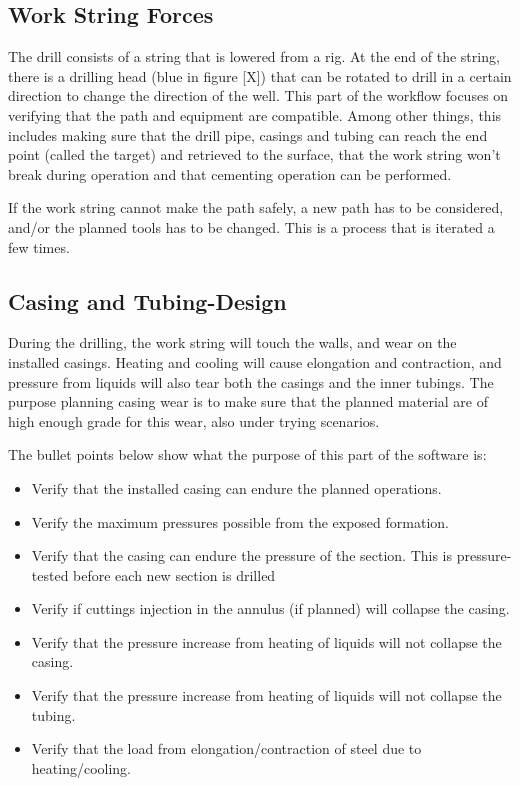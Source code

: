 \documentclass{report}
\begin{document}
\subsection{Work String Forces}
The drill consists of a string that is lowered from a rig. At the end of the string, there is a drilling head (blue in figure [X]) that can be rotated to drill in a certain direction to change the direction of the well. This part of the workflow focuses on verifying that the path and equipment are compatible. Among other things, this includes making sure that the drill pipe, casings and tubing can reach the end point (called the target) and retrieved to the surface, that the work string won’t break during operation and that cementing operation can be performed.

If the work string cannot make the path safely, a new path has to be considered, and/or the planned tools has to be changed. This is a process that is iterated a few times.

\subsection{Casing and Tubing-Design}
During the drilling, the work string will touch the walls, and wear on the installed casings. Heating and cooling will cause elongation and contraction, and pressure from liquids will also tear both the casings and the inner tubings. The purpose planning casing wear is to make sure that the planned material are of high enough grade for this wear, also under trying scenarios.

The bullet points below show what the purpose of this part of the software is:
\begin{itemize}
    \item Verify that the installed casing can endure the planned operations.
    \item Verify the maximum pressures possible from the exposed formation.
    \item Verify that the casing can endure the pressure of the section. This is pressure-tested before each new section is drilled
    \item Verify if cuttings injection in the annulus (if planned) will collapse the casing.
    \item Verify that the pressure increase from heating of liquids will not collapse the casing.
    \item Verify that the pressure increase from heating of liquids will not collapse the tubing.
    \item Verify that the load from elongation/contraction of steel due to heating/cooling. 
\end{itemize}
\end{document}
